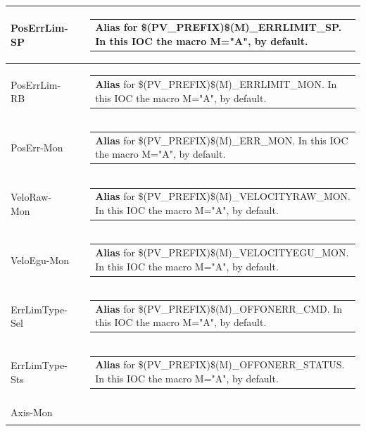 \documentclass[openany]{article}
\begin{document}
\begin{longtable}{| m{4.5cm} m{2.5cm}  m{8.0cm} |}
        PosErrLim-SP &  & \begin{tabular}{@{}m{6cm}@{}}
                \textbf{Alias} for \$(PV\_PREFIX)\$(M)\_ERRLIMIT\_SP. In this IOC the macro M="A", by default.
            \end{tabular} \hypertarget{}{}\\ \hline
        PosErrLim-RB &  & \begin{tabular}{@{}m{6cm}@{}}
                \textbf{Alias} for \$(PV\_PREFIX)\$(M)\_ERRLIMIT\_MON. In this IOC the macro M="A", by default.
            \end{tabular} \hypertarget{}{}\\ \hline
        PosErr-Mon &  & \begin{tabular}{@{}m{6cm}@{}}
                \textbf{Alias} for \$(PV\_PREFIX)\$(M)\_ERR\_MON. In this IOC the macro M="A", by default.
            \end{tabular} \hypertarget{}{}\\ \hline
        VeloRaw-Mon &  & \begin{tabular}{@{}m{6cm}@{}}
                \textbf{Alias} for \$(PV\_PREFIX)\$(M)\_VELOCITYRAW\_MON. In this IOC the macro M="A", by default.
            \end{tabular} \hypertarget{}{}\\ \hline
        VeloEgu-Mon &  & \begin{tabular}{@{}m{6cm}@{}}
                \textbf{Alias} for \$(PV\_PREFIX)\$(M)\_VELOCITYEGU\_MON. In this IOC the macro M="A", by default.
            \end{tabular} \hypertarget{}{}\\ \hline
        ErrLimType-Sel &  & \begin{tabular}{@{}m{6cm}@{}}
                \textbf{Alias} for \$(PV\_PREFIX)\$(M)\_OFFONERR\_CMD. In this IOC the macro M="A", by default.
            \end{tabular} \hypertarget{}{}\\ \hline
        ErrLimType-Sts &  & \begin{tabular}{@{}m{6cm}@{}}
                \textbf{Alias} for \$(PV\_PREFIX)\$(M)\_OFFONERR\_STATUS. In this IOC the macro M="A", by default.
            \end{tabular} \hypertarget{}{}\\ \hline
        Axis-Mon &  & \begin{tabular}{@{}m{6cm}@{}}

\end{tabular}
\end{longtable}
\end{document}
